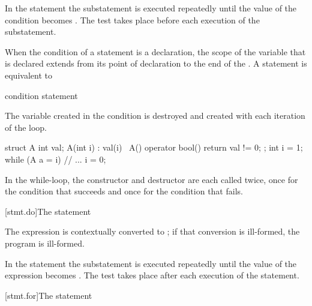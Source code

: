 \pnum
In the  statement the substatement is executed repeatedly
until the value of the condition becomes
. The test takes place before each execution of the
substatement.

\pnum
{}%
When the condition of a  statement is a declaration, the scope of
the variable that is declared extends from its point of
declaration to the end of the 
. A  statement is equivalent to
\begin{ncsimplebnf}
 \terminal{:}\br
\terminal{\{}\br
\bnfindent {} \terminal{(} condition \terminal{)} \terminal{\{}\br
\bnfindent \bnfindent statement\br
\bnfindent \bnfindent {}  \terminal{;}\br
\bnfindent \terminal{\}}\br
\terminal{\}}
\end{ncsimplebnf}
\begin{note}
The variable created in the condition is destroyed and created with each
iteration of the loop.
\begin{example}
\begin{codeblock}
struct A {
  int val;
  A(int i) : val(i) { }
  ~A() { }
  operator bool() { return val != 0; }
};
int i = 1;
while (A a = i) {
  // ...
  i = 0;
}
\end{codeblock}
In the while-loop, the constructor and destructor are each called twice,
once for the condition that succeeds and once for the condition that
fails.
\end{example}
\end{note}

[stmt.do]{The  statement}%

\pnum
The expression is contextually converted to ;
if that conversion is ill-formed, the program is ill-formed.

\pnum
In the  statement the substatement is executed repeatedly
until the value of the expression becomes . The test takes
place after each execution of the statement.

[stmt.for]{The  statement}%

